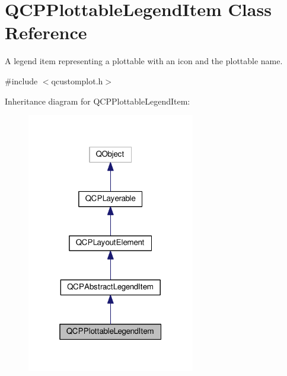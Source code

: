 \hypertarget{classQCPPlottableLegendItem}{}\section{Q\+C\+P\+Plottable\+Legend\+Item Class Reference}
\label{classQCPPlottableLegendItem}


A legend item representing a plottable with an icon and the plottable name.  




{\ttfamily \#include $<$qcustomplot.\+h$>$}



Inheritance diagram for Q\+C\+P\+Plottable\+Legend\+Item\+:
\nopagebreak
\begin{figure}[H]
\begin{center}
\leavevmode
\includegraphics[width=208pt]{classQCPPlottableLegendItem__inherit__graph}
\end{center}
\end{figure}


